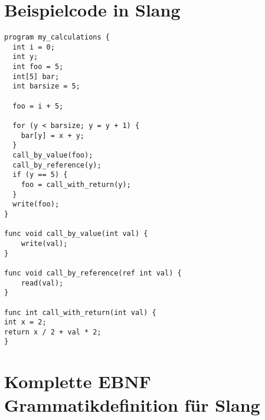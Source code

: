 \chapter{Beispielcode in Slang}
\label{fig:slicc:slang}

\begin{lstlisting}
program my_calculations {
  int i = 0;
  int y;
  int foo = 5;
  int[5] bar;
  int barsize = 5;
  
  foo = i + 5;
  
  for (y < barsize; y = y + 1) {
    bar[y] = x + y;
  }
  call_by_value(foo);
  call_by_reference(y);
  if (y == 5) {
  	foo = call_with_return(y);
  }
  write(foo);
}

func void call_by_value(int val) {
	write(val);
}

func void call_by_reference(ref int val) {
	read(val);
}

func int call_with_return(int val) {
int x = 2;
return x / 2 + val * 2;
}
\end{lstlisting}

\chapter{Komplette EBNF Grammatikdefinition für Slang}
\label{fig:slicc:slang:ebnf}

